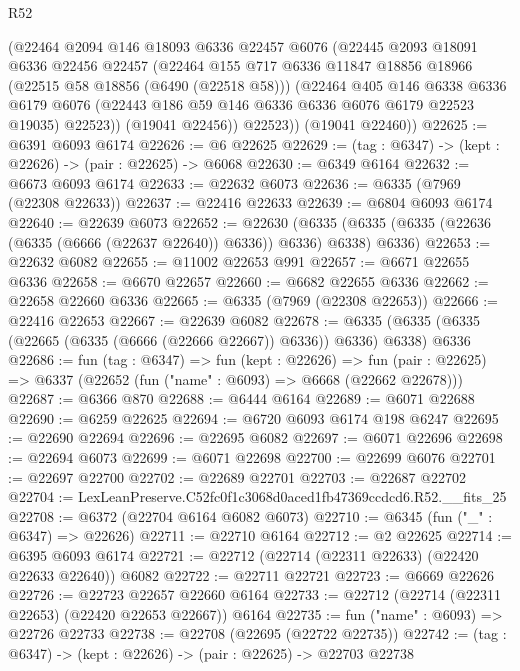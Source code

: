 \begin{lexlean}{R52}
\begin{coremodule}
        (@22464
          @2094
          @146
          @18093
          @6336
          @22457
          @6076
          (@22445
            @2093
            @18091
            @6336
            @22456
            @22457
            (@22464
              @155
              @717
              @6336
              @11847
              @18856
              @18966
              (@22515 @58 @18856 (@6490 (@22518 @58)))
              (@22464
                @405
                @146
                @6338
                @6336
                @6179
                @6076
                (@22443 @186 @59 @146 @6336 @6336 @6076 @6179 @22523 @19035)
                @22523))
            (@19041 @22456))
          @22523))
      (@19041 @22460))
@22625 := @6391 @6093 @6174
@22626 := @6 @22625
@22629 := (tag : @6347) -> (kept : @22626) -> (pair : @22625) -> @6068
@22630 := @6349 @6164
@22632 := @6673 @6093 @6174
@22633 := @22632 @6073
@22636 := @6335 (@7969 (@22308 @22633))
@22637 := @22416 @22633
@22639 := @6804 @6093 @6174
@22640 := @22639 @6073
@22652 := @22630
    (@6335 (@6335 (@6335 (@22636 (@6335 (@6666 (@22637 @22640)) @6336)) @6336) @6338) @6336)
@22653 := @22632 @6082
@22655 := @11002 @22653 @991
@22657 := @6671 @22655 @6336
@22658 := @6670 @22657
@22660 := @6682 @22655 @6336
@22662 := @22658 @22660 @6336
@22665 := @6335 (@7969 (@22308 @22653))
@22666 := @22416 @22653
@22667 := @22639 @6082
@22678 := @6335 (@6335 (@6335 (@22665 (@6335 (@6666 (@22666 @22667)) @6336)) @6336) @6338) @6336
@22686 := fun (tag : @6347) =>
  fun (kept : @22626) =>
  fun (pair : @22625) => @6337 (@22652 (fun ("name" : @6093) => @6668 (@22662 @22678)))
@22687 := @6366 @870
@22688 := @6444 @6164
@22689 := @6071 @22688
@22690 := @6259 @22625
@22694 := @6720 @6093 @6174 @198 @6247
@22695 := @22690 @22694
@22696 := @22695 @6082
@22697 := @6071 @22696
@22698 := @22694 @6073
@22699 := @6071 @22698
@22700 := @22699 @6076
@22701 := @22697 @22700
@22702 := @22689 @22701
@22703 := @22687 @22702
@22704 := LexLeanPreserve.C52fc0f1c3068d0aced1fb47369ccdcd6.R52.__fits_25
@22708 := @6372 (@22704 @6164 @6082 @6073)
@22710 := @6345 (fun ("_" : @6347) => @22626)
@22711 := @22710 @6164
@22712 := @2 @22625
@22714 := @6395 @6093 @6174
@22721 := @22712 (@22714 (@22311 @22633) (@22420 @22633 @22640)) @6082
@22722 := @22711 @22721
@22723 := @6669 @22626
@22726 := @22723 @22657 @22660 @6164
@22733 := @22712 (@22714 (@22311 @22653) (@22420 @22653 @22667)) @6164
@22735 := fun ("name" : @6093) => @22726 @22733
@22738 := @22708 (@22695 (@22722 @22735))
@22742 := (tag : @6347) -> (kept : @22626) -> (pair : @22625) -> @22703 @22738

\end{coremodule}
\end{lexlean}
